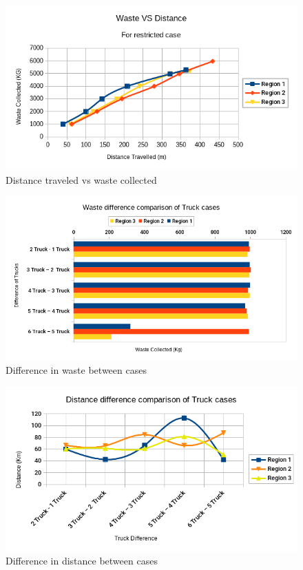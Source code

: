 \documentclass[12pt]{article}
\begin{document}
\begin{figure}[H]
    \centering
    \includegraphics[scale=0.6]{distance_VS_garbage_restricted.png}
    \caption{Distance traveled vs waste collected}\label{figz}
\end{figure}
\begin{figure}[H]
    \centering
    \includegraphics[scale=0.6]{Waste Difference Between Trucks.png}
    \caption{Difference in waste between cases}\label{figd1}
\end{figure}
\begin{figure}[H]
    \centering
    \includegraphics[scale=0.6]{Distance Difference Between Trucks Scatterplot.png}
    \caption{Difference in distance between cases}\label{figd2}
\end{figure}
\end{document}
